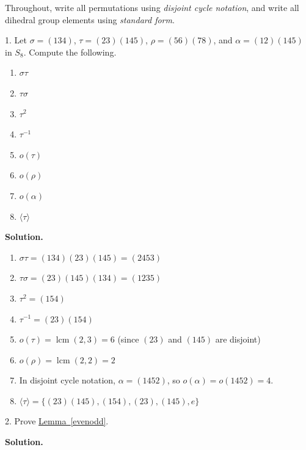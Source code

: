 \documentclass[10pt,]{book}
\theoremstyle{plain}
\theoremstyle{definition}
\theoremstyle{definition}
\theoremstyle{definition}
\theoremstyle{definition}
\numberwithin{equation}{section}
\DeclareMathOperator{\lcm}{lcm}
\begin{document}
Throughout, write all permutations using \emph{disjoint cycle notation}, and write all dihedral group elements using \emph{standard form}.%
\begin{exerciselist}
\item[1.]\hypertarget{exercise-41}{}
        Let \(\sigma=(134)\), \(\tau=(23)(145)\), \(\rho=(56)(78)\), and \(\alpha=(12)(145)\) in \(S_8\). Compute the following.
        \leavevmode%
\begin{multicols}{4}
\begin{enumerate}[label=(\alph*)]
\item\hypertarget{li-360}{}
              \(\sigma \tau\)
\item\hypertarget{li-361}{}
              \(\tau \sigma\)
\item\hypertarget{li-362}{}
              \(\tau^2\)
\item\hypertarget{li-363}{}
              \(\tau^{-1}\)
\item\hypertarget{li-364}{}
              \(o(\tau)\)
\item\hypertarget{li-365}{}
              \(o(\rho)\)
\item\hypertarget{li-366}{}
              \(o(\alpha)\)
\item\hypertarget{li-367}{}
              \(\langle \tau\rangle\)
\end{enumerate}
\end{multicols}

\par\smallskip
\par\smallskip
\noindent\textbf{Solution.}\hypertarget{solution-41}{}\quad
\leavevmode%
\begin{enumerate}[label=(\alph*)]
\item\hypertarget{li-368}{}
          \(\sigma \tau= (134)(23)(145)=(2453)\)
\item\hypertarget{li-369}{}
          \(\tau \sigma=  (23)(145)(134)=(1235)\)
\item\hypertarget{li-370}{}
          \(\tau^2=(154)\)
\item\hypertarget{li-371}{}
          \(\tau^{-1}=(23)(154)\)
\item\hypertarget{li-372}{}
          \(o(\tau)=\lcm(2,3)=6\) (since \((23)\) and \((145)\) are disjoint)
\item\hypertarget{li-373}{}
          \(o(\rho)=\lcm(2,2)=2\)
\item\hypertarget{li-374}{}
          In disjoint cycle notation, \(\alpha=(1452)\), so \(o(\alpha)=o(1452)=4\).
\item\hypertarget{li-375}{}
          \(\langle \tau\rangle =\{(23)(145), (154), (23), (145), e\}\)
\end{enumerate}
\item[2.]\hypertarget{exercise-42}{}
        Prove \hyperref[evenodd]{Lemma~\ref{evenodd}}.
\par\smallskip
\par\smallskip
\noindent\textbf{Solution.}\hypertarget{solution-42}{}\quad


\end{exerciselist}
\end{document}
